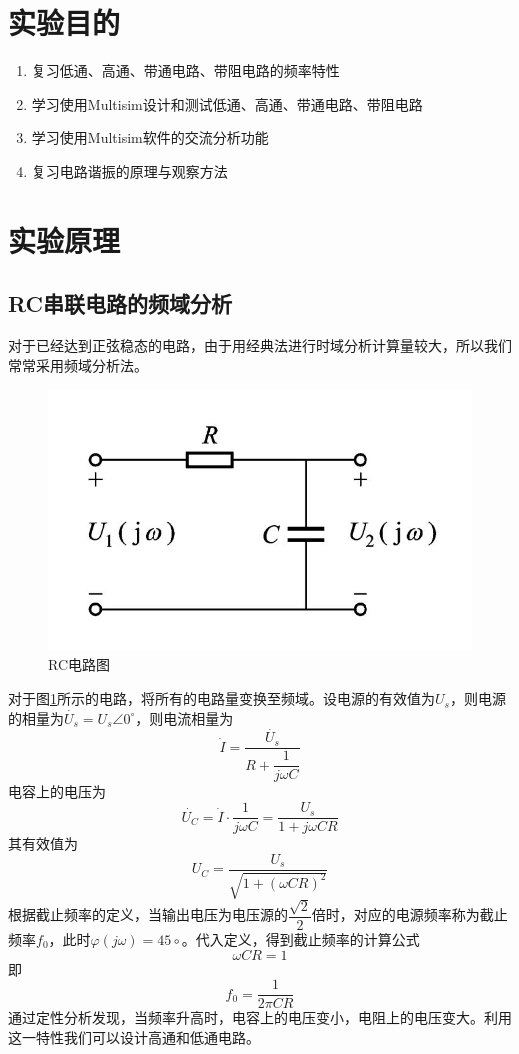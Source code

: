 \documentclass{ctexart}
\begin{document}
\section{实验目的}

\begin{enumerate}
    \item 复习低通、高通、带通电路、带阻电路的频率特性
    \item 学习使用Multisim设计和测试低通、高通、带通电路、带阻电路
    \item 学习使用Multisim软件的交流分析功能
    \item 复习电路谐振的原理与观察方法
\end{enumerate}
\section{实验原理}
\subsection{RC串联电路的频域分析}
对于已经达到正弦稳态的电路，由于用经典法进行时域分析计算量较大，所以我们常常采用频域分析法。
\begin{figure}[h]
    \centering
    \includegraphics{pic/RC电路图.jpg}
    \caption{RC电路图}
    \label{fig:RC串联电路图}
\end{figure}
对于图\ref{fig:RC串联电路图}所示的电路，将所有的电路量变换至频域。设电源的有效值为$U_s$，则电源的相量为$\Dot{U_s}=U_s\angle 0^\circ $，则电流相量为
\begin{equation}
    \Dot{I}=\dfrac{\Dot{U_s}}{R+\dfrac{1}{j\omega C}}
\end{equation}
电容上的电压为
\begin{equation}
    \Dot{U_C}=\Dot{I}\cdot \dfrac{1}{j\omega C}=\dfrac{U_s}{1+j\omega CR}
\end{equation}
其有效值为
\begin{equation}
    U_C=\dfrac{U_s}{\sqrt{1+(\omega CR)^2}}
\end{equation}
根据截止频率的定义，当输出电压为电压源的$\dfrac{\sqrt{2}}{2}$倍时，对应的电源频率称为截止频率$f_0$，此时$\varphi(j\omega)=45\circ$。代入定义，得到截止频率的计算公式
\begin{equation}
    \omega CR =1
\end{equation}
即
\begin{equation}
    f_0=\dfrac{1}{2\pi CR}
\end{equation}
通过定性分析发现，当频率升高时，电容上的电压变小，电阻上的电压变大。利用这一特性我们可以设计高通和低通电路。
\end{document}
